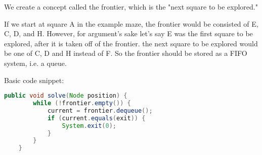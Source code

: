 \documentclass [12 pt, twoside] {article}
\begin{document}
We create a concept called the frontier, which is the "next square to be
explored."

If we start at square A in the example maze, the frontier would be consisted of
E, C, D, and H. However, for argument's sake let's say E was the first square to
be explored, after it is taken off of the frontier. the next square to be
explored would be one of C, D and H instead of F. So the frontier should be
stored as a FIFO system, i.e. a queue.

Basic code snippet:
\begin{lstlisting}[language=java]
    public void solve(Node position) {
        while (!frontier.empty()) {
            current = frontier.dequeue();
            if (current.equals(exit)) {
                System.exit(0);
            }
        }
    }
\end{lstlisting}
\end{document}
